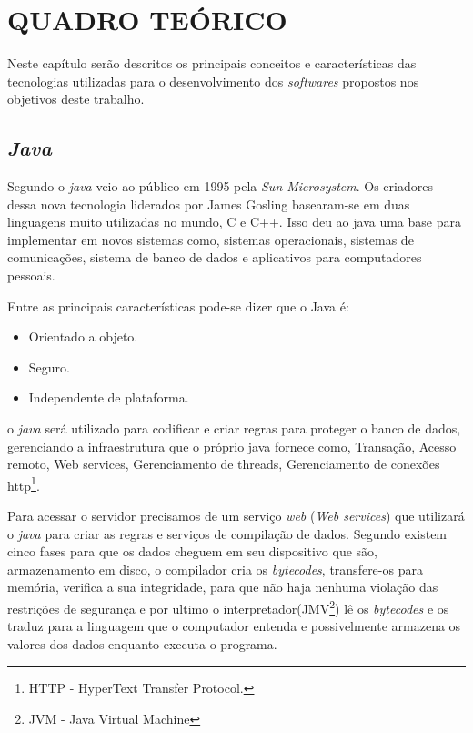 \chapter{QUADRO TEÓRICO}

	\par Neste capítulo serão descritos os principais conceitos e características
das tecnologias utilizadas para o desenvolvimento dos \textit{softwares}
propostos nos objetivos deste trabalho.

\section{\textit{Java}}

	\par Segundo  o \textit{java} veio ao público em 1995 pela
\textit{Sun Microsystem}. Os criadores dessa nova tecnologia liderados por
James Gosling basearam-se em duas linguagens muito utilizadas no mundo, C e C++.
Isso deu ao java uma base para implementar em novos sistemas como, sistemas
operacionais, sistemas de comunicações, sistema de banco de dados e aplicativos
para computadores pessoais.

	\par Entre as principais características pode-se dizer que o Java é:
	
	\begin{itemize}

	  \item Orientado a objeto.
	  
	  \item Seguro.%
	  
	  \item Independente de plataforma. 

	\end{itemize}
	
	\par {} o \textit{java} será utilizado para codificar e
criar regras para proteger o banco de dados, gerenciando a infraestrutura que
o próprio java fornece como, Transação, Acesso remoto, Web services,
Gerenciamento de threads, Gerenciamento de conexões http\footnote{HTTP -
HyperText Transfer Protocol.}.

	\par Para acessar o servidor precisamos de um serviço \textit{web} (\textit{Web
services}) que utilizará o \textit{java} para criar as regras e serviços de
compilação de dados. Segundo  existem cinco fases para
que os dados cheguem em seu dispositivo que são, armazenamento em disco, o
compilador cria os \textit{bytecodes}, transfere-os para memória, verifica a sua
integridade, para que não haja nenhuma violação das restrições de segurança e
por ultimo o interpretador(JMV\footnote{JVM - Java Virtual Machine}) lê os
\textit{bytecodes} e os traduz para a linguagem que o computador entenda e
possivelmente armazena os valores dos dados enquanto executa o programa.

